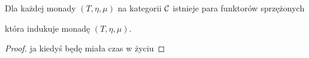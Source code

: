 \begin{lemma}{}{}
  Dla każdej monady $(T,\eta, \mu)$ na kategorii $\mathcal{C}$ istnieje para funktorów sprzężonych 
  \begin{center}
  \end{center}
  która indukuje monadę $(T,\eta,\mu)$.
\end{lemma}

\begin{proof}
  ja kiedyś będę miała czas w życiu
\end{proof}

